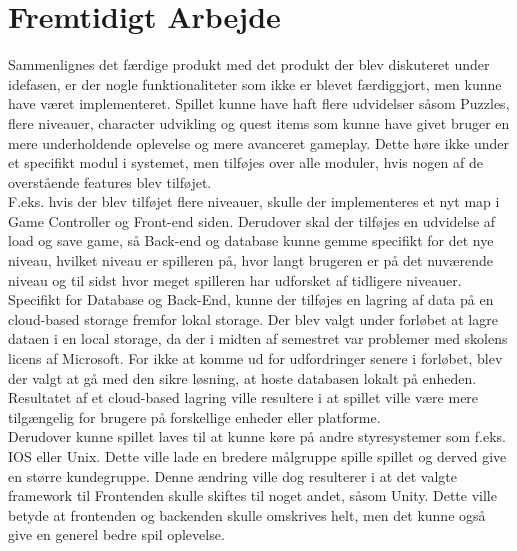 \section{Fremtidigt Arbejde}
Sammenlignes det færdige produkt med det produkt der blev diskuteret under idefasen, er der nogle funktionaliteter som ikke er blevet færdiggjort, men kunne have været implementeret. Spillet kunne have haft flere udvidelser såsom Puzzles, flere niveauer, character udvikling og quest items som kunne have givet bruger en mere underholdende oplevelse og mere avanceret gameplay. Dette høre ikke under et specifikt modul i systemet, men tilføjes over alle moduler, hvis nogen af de overstående features blev tilføjet. \\

\noindent F.eks. hvis der blev tilføjet flere niveauer, skulle der implementeres et nyt map i Game Controller og Front-end siden. Derudover skal der tilføjes en udvidelse af load og save game, så Back-end og database kunne gemme specifikt for det nye niveau, hvilket niveau er spilleren på, hvor langt brugeren er på det nuværende niveau og til sidst hvor meget spilleren har udforsket af tidligere niveauer.\\

\noindent Specifikt for Database og Back-End, kunne der tilføjes en lagring af data på en cloud-based storage fremfor lokal storage. Der blev valgt under forløbet at lagre dataen i en local storage, da der i midten af semestret var problemer med skolens licens af Microsoft. For ikke at komme ud for udfordringer senere i forløbet, blev der valgt at gå med den sikre løsning, at hoste databasen lokalt på enheden. Resultatet af et cloud-based lagring ville resultere i at spillet ville være mere tilgængelig for brugere på forskellige enheder eller platforme. \\

\noindent Derudover kunne spillet laves til at kunne køre på andre styresystemer som f.eks. IOS eller Unix. Dette ville lade en bredere målgruppe spille spillet og derved give en større kundegruppe. Denne ændring ville dog resulterer i at det valgte framework til Frontenden skulle skiftes til noget andet, såsom Unity. Dette ville betyde at frontenden og backenden skulle omskrives helt, men det kunne også give en generel bedre spil oplevelse.



